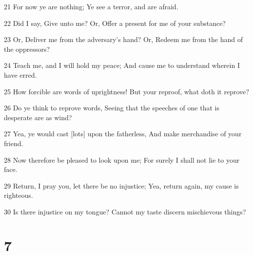 \par 21 For now ye are nothing; Ye see a terror, and are afraid.
\par 22 Did I say, Give unto me? Or, Offer a present for me of your substance?
\par 23 Or, Deliver me from the adversary's hand? Or, Redeem me from the hand of the oppressors?
\par 24 Teach me, and I will hold my peace; And cause me to understand wherein I have erred.
\par 25 How forcible are words of uprightness! But your reproof, what doth it reprove?
\par 26 Do ye think to reprove words, Seeing that the speeches of one that is desperate are as wind?
\par 27 Yea, ye would cast [lots] upon the fatherless, And make merchandise of your friend.
\par 28 Now therefore be pleased to look upon me; For surely I shall not lie to your face.
\par 29 Return, I pray you, let there be no injustice; Yea, return again, my cause is righteous.
\par 30 Is there injustice on my tongue? Cannot my taste discern mischievous things?

\chapter{7}


